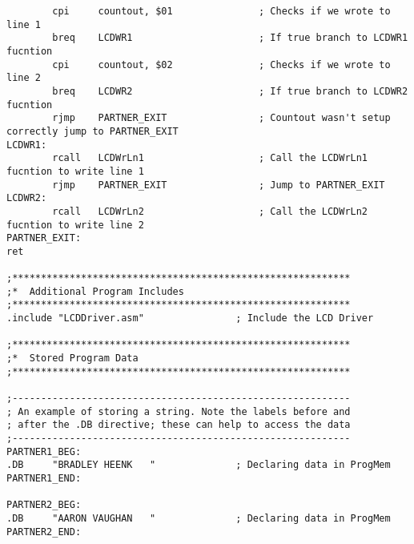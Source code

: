 \documentclass[12pt, letterpaper]{article}
\begin{document}
\begin{verbatim}
		cpi		countout, $01				; Checks if we wrote to line 1
		breq	LCDWR1						; If true branch to LCDWR1 fucntion
		cpi		countout, $02				; Checks if we wrote to line 2
		breq	LCDWR2						; If true branch to LCDWR2 fucntion
		rjmp	PARTNER_EXIT				; Countout wasn't setup correctly jump to PARTNER_EXIT
LCDWR1:
		rcall	LCDWrLn1					; Call the LCDWrLn1 fucntion to write line 1
		rjmp	PARTNER_EXIT				; Jump to PARTNER_EXIT
LCDWR2:
		rcall	LCDWrLn2					; Call the LCDWrLn2 fucntion to write line 2
PARTNER_EXIT:
ret

;***********************************************************
;*	Additional Program Includes
;***********************************************************
.include "LCDDriver.asm"				; Include the LCD Driver

;***********************************************************
;*	Stored Program Data
;***********************************************************

;-----------------------------------------------------------
; An example of storing a string. Note the labels before and
; after the .DB directive; these can help to access the data
;-----------------------------------------------------------
PARTNER1_BEG:
.DB		"BRADLEY HEENK   "				; Declaring data in ProgMem
PARTNER1_END:

PARTNER2_BEG:
.DB		"AARON VAUGHAN   "				; Declaring data in ProgMem
PARTNER2_END:

\end{verbatim}
\end{document}
